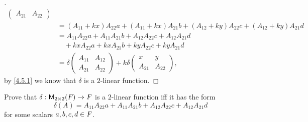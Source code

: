 \begin{proof}[]
\begin{align*}
\begin{pmatrix}
			         A_{2 1}      & A_{2 2}
		         \end{pmatrix}                                                                           \\
		 & = (A_{1 1} + kx) A_{2 2} a + (A_{1 1} + kx) A_{2 1} b + (A_{1 2} + ky) A_{2 2} c + (A_{1 2} + ky) A_{2 1} d \\
		 & = A_{1 1} A_{2 2} a + A_{1 1} A_{2 1} b + A_{1 2} A_{2 2} c + A_{1 2} A_{2 1} d                             \\
		 & \quad + kx A_{2 2} a + kx A_{2 1} b + ky A_{2 2} c + ky A_{2 1} d                                           \\
		 & = \delta\begin{pmatrix}
			           A_{1 1} & A_{1 2} \\
			           A_{2 1} & A_{2 2}
		           \end{pmatrix} + k \delta\begin{pmatrix}
			                                   x       & y       \\
			                                   A_{2 1} & A_{2 2}
		                                   \end{pmatrix},
	\end{align*}
	by \cref{4.5.1} we know that \(\delta\) is a \(2\)-linear function.
\end{proof}

\begin{ex}\label{ex:4.5.15}
	Prove that \(\delta : \ms[2][2][\F] \to \F\) is a \(2\)-linear function iff it has the form
	\[
		\delta(A) = A_{1 1} A_{2 2} a + A_{1 1} A_{2 1} b + A_{1 2} A_{2 2} c + A_{1 2} A_{2 1} d
	\]
	for some scalars \(a, b, c, d \in \mathit{F}\).
\end{ex}

